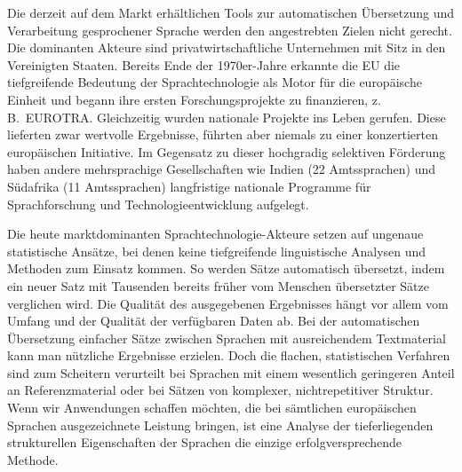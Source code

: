 \documentclass[]{../../metanetpaper}
\begin{document}
\begin{multicols}{2}
Die derzeit auf dem Markt erhältlichen Tools zur automatischen Übersetzung und Verarbeitung gesprochener Sprache werden den angestrebten Zielen nicht gerecht. Die dominanten Akteure sind privatwirtschaftliche Unternehmen mit Sitz in den Vereinigten Staaten. Bereits Ende der 1970er-Jahre erkannte die EU die tiefgreifende Bedeutung der Sprachtechnologie als Motor für die europäische Einheit und begann ihre ersten Forschungsprojekte zu finanzieren, z.\,B.~EUROTRA. Gleichzeitig wurden nationale Projekte ins Leben gerufen. Diese lieferten zwar wertvolle Ergebnisse, führten aber niemals zu einer konzertierten europäischen Initiative. Im Gegensatz zu dieser hochgradig selektiven Förderung haben andere mehrsprachige Gesellschaften wie Indien (22 Amtssprachen) und Südafrika (11 Amtssprachen) langfristige nationale Programme für Sprachforschung und Technologieentwicklung aufgelegt. 


Die heute marktdominanten Sprach\-tech\-no\-logie-Ak\-teu\-re setzen auf ungenaue statistische Ansätze, bei denen keine tiefgreifende linguistische Analysen und Methoden zum Einsatz kommen. So werden Sätze automatisch übersetzt, indem ein neuer Satz mit Tausenden bereits früher vom Menschen übersetzter Sätze verglichen wird. Die Qualität des ausgegebenen Ergebnisses hängt vor allem vom Umfang und der Qualität der verfügbaren Daten ab. Bei der automatischen Übersetzung einfacher Sätze zwischen Sprachen mit ausreichendem Textmaterial kann man nützliche Ergebnisse erzielen. Doch die flachen, statistischen Verfahren sind zum Scheitern verurteilt bei Sprachen mit einem wesentlich geringeren Anteil an Referenzmaterial oder bei Sätzen von komplexer, nichtrepetitiver Struktur. Wenn wir Anwendungen schaffen möchten, die bei sämtlichen europäischen Sprachen ausgezeichnete Leistung bringen, ist eine Analyse der tieferliegenden strukturellen Eigenschaften der Sprachen die einzige erfolgversprechende Methode.


\end{multicols}
\end{document}

